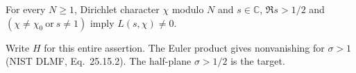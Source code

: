 
\begin{formalstatement}\label{pn:P003}
For every $N\ge1$, Dirichlet character $\chi$ modulo $N$ and $s\in\mathbb C$, $\Re s>1/2$ and $(\chi\ne\chi_0\ \text{or}\ s\ne1)$ imply $L(s,\chi)\ne0$.
\end{formalstatement}
Write $H$ for this entire assertion. The Euler product gives nonvanishing for $\sigma>1$ (NIST DLMF, Eq.~25.15.2). The half-plane $\sigma>1/2$ is the target.
